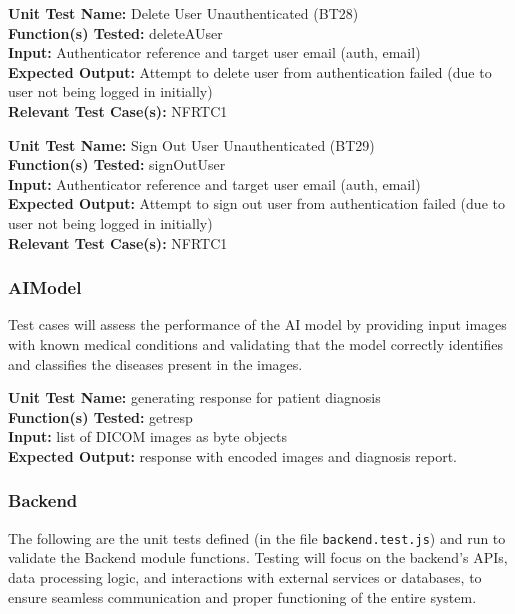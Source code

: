\documentclass[12pt, titlepage]{article}
\begin{document}
\begin{mdframed}[linewidth=0.5mm]
  \textbf{Unit Test Name:} Delete User Unauthenticated (BT28) \\
  \textbf{Function(s) Tested:} deleteAUser \\
  \textbf{Input:} Authenticator reference and target user email (auth, email) \\
  \textbf{Expected Output:} Attempt to delete user from authentication failed (due to user not being logged in initially) \\
  \textbf{Relevant Test Case(s):} NFRTC1
\end{mdframed}

\begin{mdframed}[linewidth=0.5mm]
  \textbf{Unit Test Name:} Sign Out User Unauthenticated (BT29) \\
  \textbf{Function(s) Tested:} signOutUser \\
  \textbf{Input:} Authenticator reference and target user email (auth, email) \\
  \textbf{Expected Output:} Attempt to sign out user from authentication failed (due to user not being logged in initially) \\
  \textbf{Relevant Test Case(s):} NFRTC1
\end{mdframed}

\subsubsection{AIModel}
Test cases will assess the performance of the AI model by providing input images with known medical conditions and validating that the model correctly identifies and classifies the diseases present in the images.

\begin{mdframed}[linewidth=0.5mm]
  \textbf{Unit Test Name:} generating response for patient diagnosis \\
  \textbf{Function(s) Tested:} getresp \\
  \textbf{Input:} list of DICOM images as byte objects \\
  \textbf{Expected Output:} response with encoded images and diagnosis report.  
\end{mdframed}

\subsubsection{Backend}
The following are the unit tests defined (in the file \texttt{backend.test.js}) and run to validate the Backend module functions. Testing will focus on the backend's APIs, data processing logic, and interactions with external services or databases, to ensure seamless communication and proper functioning of the entire system.
\end{document}
